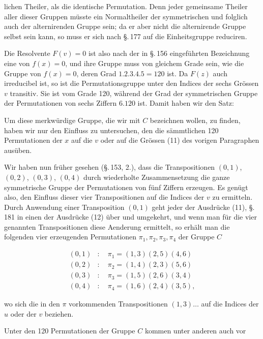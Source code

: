 lichen Theiler, als die identische Permutation. Denn jeder gemeinsame Theiler aller dieser Gruppen müsste ein Normaltheiler der symmetrischen und folglich auch der alternirenden Gruppe sein; da er aber nicht die alternirende Gruppe selbst sein kann, so muss er sich nach \S.\,177 auf die Einheitsgruppe reduciren.

Die Resolvente $F(v) = 0$ ist also nach der in \S.\,156 eingeführten Bezeichnung eine  von $f(x) = 0$, und ihre Gruppe muss von gleichem Grade sein, wie die Gruppe von $f(x) = 0$, deren Grad $1 . 2 . 3 . 4 . 5 = 120$ ist. Da $F(z)$ auch irreducibel ist, so ist die Permutationsgruppe unter den Indices der sechs Grössen $v$ transitiv. Sie ist vom Grade 120, während der Grad der symmetrischen Gruppe der Permutationen von sechs Ziffern $6 . 120$ ist. Damit haben wir den Satz:


Um diese merkwürdige Gruppe, die wir mit $C$ bezeichnen wollen, zu finden, haben wir nur den Einfluss zu untersuchen, den die sämmtlichen 120 Permutationen der $x$ auf die $v$ oder auf die Grössen (11) des vorigen Paragraphen ausüben.

Wir haben nun früher gesehen (\S.\,153, 2.), dass die Transpositionen $(0, 1)$, $(0, 2)$, $(0, 3)$, $(0, 4)$ durch wiederholte Zusammensetzung die ganze symmetrische Gruppe der Permutationen von fünf Ziffern erzeugen. Es genügt also, den Einfluss dieser vier Transpositionen auf die Indices der $v$ zu ermitteln. Durch Anwendung einer Transposition $(0, 1)$ geht jeder der Ausdrücke (11), \S.\,181 in einen der Ausdrücke (12) über und umgekehrt, und wenn man für die vier genannten Transpositionen diese Aenderung ermittelt, so erhält man die folgenden vier erzeugenden Permutationen $\pi_1, \pi_2, \pi_3, \pi_4$ der Gruppe $C$

\[
\begin{aligned}
(0, 1)&: \quad \pi_1 = (1, 3) (2, 5) (4, 6) \\
(0, 2)&: \quad \pi_2 = (1, 4) (2, 3) (5, 6) \\
(0, 3)&: \quad \pi_3 = (1, 5) (2, 6) (3, 4) \\
(0, 4)&: \quad \pi_4 = (1, 6) (2, 4) (3, 5),
\end{aligned}
\]

wo sich die in den $\pi$ vorkommenden Transpositionen $(1, 3) \ldots$ auf die Indices der $u$ oder der $v$ beziehen.

Unter den 120 Permutationen der Gruppe $C$ kommen unter anderen auch vor
